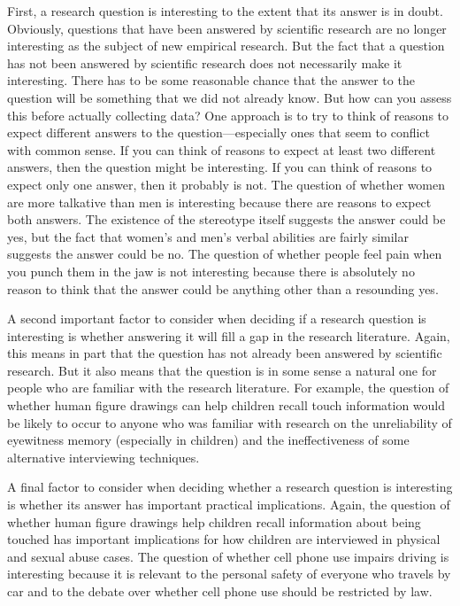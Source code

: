 \documentclass[
]{krantz}
\begin{document}
First, a research question is interesting to the extent that its answer is in doubt. Obviously, questions that have been answered by scientific research are no longer interesting as the subject of new empirical research. But the fact that a question has not been answered by scientific research does not necessarily make it interesting. There has to be some reasonable chance that the answer to the question will be something that we did not already know. But how can you assess this before actually collecting data? One approach is to try to think of reasons to expect different answers to the question---especially ones that seem to conflict with common sense. If you can think of reasons to expect at least two different answers, then the question might be interesting. If you can think of reasons to expect only one answer, then it probably is not. The question of whether women are more talkative than men is interesting because there are reasons to expect both answers. The existence of the stereotype itself suggests the answer could be yes, but the fact that women's and men's verbal abilities are fairly similar suggests the answer could be no. The question of whether people feel pain when you punch them in the jaw is not interesting because there is absolutely no reason to think that the answer could be anything other than a resounding yes.

A second important factor to consider when deciding if a research question is interesting is whether answering it will fill a gap in the research literature. Again, this means in part that the question has not already been answered by scientific research. But it also means that the question is in some sense a natural one for people who are familiar with the research literature. For example, the question of whether human figure drawings can help children recall touch information would be likely to occur to anyone who was familiar with research on the unreliability of eyewitness memory (especially in children) and the ineffectiveness of some alternative interviewing techniques.

A final factor to consider when deciding whether a research question is interesting is whether its answer has important practical implications. Again, the question of whether human figure drawings help children recall information about being touched has important implications for how children are interviewed in physical and sexual abuse cases. The question of whether cell phone use impairs driving is interesting because it is relevant to the personal safety of everyone who travels by car and to the debate over whether cell phone use should be restricted by law.
\end{document}
